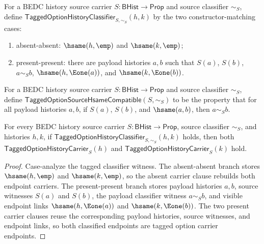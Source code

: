 \begin{definition}
\label{def:tagged-option-history-classifier}
For a BEDC history source carrier $S:\mathsf{BHist}\to\mathsf{Prop}$ and source classifier $\sim_S$, define $\mathsf{TaggedOptionHistoryClassifier}_{S,\sim_S}(h,k)$ by the two constructor-matching cases:
\begin{enumerate}
  \item absent-absent: $\hsame(h,\emp)$ and $\hsame(k,\emp)$;
  \item present-present: there are payload histories $a,b$ such that $S(a)$, $S(b)$, $a\sim_S b$, $\hsame(h,\Eone(a))$, and $\hsame(k,\Eone(b))$.
\end{enumerate}
\end{definition}

\begin{definition}
\label{def:tagged-option-source-hsame-compatibility}
For a BEDC history source carrier $S:\mathsf{BHist}\to\mathsf{Prop}$ and source classifier $\sim_S$, define $\mathsf{TaggedOptionSourceHsameCompatible}(S,\sim_S)$ to be the property that for all payload histories $a,b$, if $S(a)$, $S(b)$, and $\hsame(a,b)$, then $a\sim_S b$.
\end{definition}

\begin{theorem}
\label{thm:tagged-option-history-classifier-endpoint-carriers}
For every BEDC history source carrier $S:\mathsf{BHist}\to\mathsf{Prop}$,
source classifier $\sim_S$, and histories $h,k$, if
$\mathsf{TaggedOptionHistoryClassifier}_{S,\sim_S}(h,k)$ holds, then both
$\mathsf{TaggedOptionHistoryCarrier}_S(h)$ and
$\mathsf{TaggedOptionHistoryCarrier}_S(k)$ hold.
\end{theorem}
\begin{proof}
Case-analyze the tagged classifier witness. The absent-absent branch stores
$\hsame(h,\emp)$ and $\hsame(k,\emp)$, so the absent carrier clause rebuilds
both endpoint carriers. The present-present branch stores payload histories
$a,b$, source witnesses $S(a)$ and $S(b)$, the payload classifier witness
$a\sim_S b$, and visible endpoint links $\hsame(h,\Eone(a))$ and
$\hsame(k,\Eone(b))$. The two present carrier clauses reuse the corresponding
payload histories, source witnesses, and endpoint links, so both classified
endpoints are tagged option carrier endpoints.
\end{proof}

